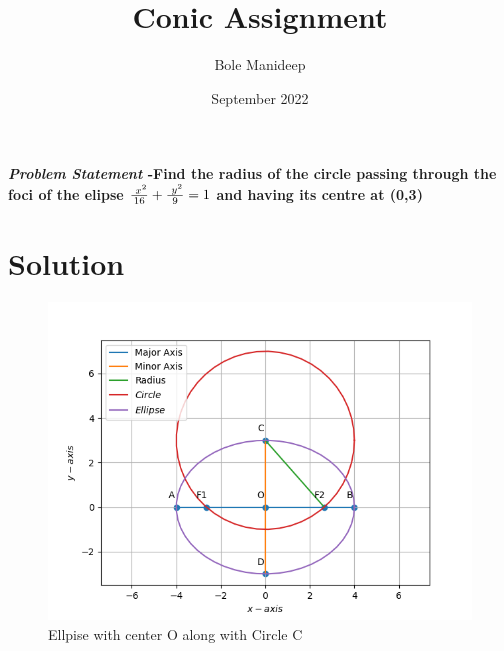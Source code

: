 \documentclass[journal,10pt,twocolumn]{article}
\title{\textbf{Conic Assignment}}
\author{Bole Manideep}
\date{September 2022}
\begin{document}
\maketitle
\paragraph{\textit{Problem Statement} -Find the radius of the circle passing through the foci of the elipse $\frac{\hspace{1mm}x^2}{16} + \frac{\hspace{1mm}y^2}{9} =1$ and having its centre at (0,3)}

\section*{Solution}

\begin{figure}[h]
\centering
\includegraphics[width=1\columnwidth]{Question.png}
\caption{Ellpise with center O along with Circle C}
\label{fig:Ellipse}
\end{figure}
\end{document}
